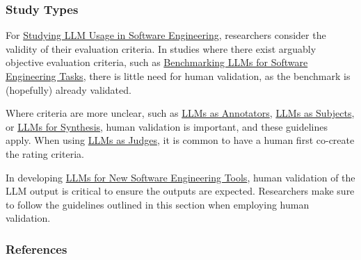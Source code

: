 \subsubsection{Study Types}

For \href{/study-types/#studying-llm-usage-in-software-engineering}{Studying LLM Usage in Software Engineering}, researchers \should consider the validity of their evaluation criteria.
In studies where there exist arguably objective evaluation criteria, such as \href{/study-types/#benchmarking-llms-for-software-engineering-tasks}{Benchmarking LLMs for Software Engineering Tasks}, there is little need for human validation, as the benchmark is (hopefully) already validated.

Where criteria are more unclear, such as \href{/study-types/#llms-as-annotators}{LLMs as Annotators}, \href{/study-types/#llms-as-subjects}{LLMs as Subjects}, or \href{/study-types/#llms-for-synthesis}{LLMs for Synthesis}, human validation is important, and these guidelines apply. When using \href{/study-types/#llms-as-judges}{LLMs as Judges}, it is common to have a human first co-create the rating criteria. 

In developing \href{/study-types/#llms-for-new-software-engineering-tools}{LLMs for New Software Engineering Tools}, human validation of the LLM output is critical to ensure the outputs are expected.
Researchers \should make sure to follow the guidelines outlined in this section when employing human validation.

\subsubsection{References}





